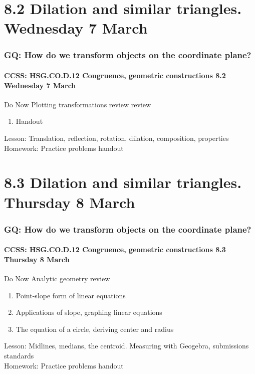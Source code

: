 \documentclass{beamer}
\begin{document}
\section{8.2 Dilation and similar triangles. Wednesday 7 March}
  \frame
  {
    \frametitle{GQ: How do we transform objects on the coordinate plane?}
    \framesubtitle{CCSS: HSG.CO.D.12 Congruence, geometric constructions \hfill \alert{8.2 Wednesday 7 March}}

    \begin{block}{Do Now Plotting transformations review review}
      \begin{enumerate}
        \item Handout
      \end{enumerate}
    \end{block}
    Lesson: Translation, reflection, rotation, dilation, composition, properties\\[0.5cm]
    Homework: Practice problems handout
  }

\section{8.3 Dilation and similar triangles. Thursday 8 March}
  \frame
  {
    \frametitle{GQ: How do we transform objects on the coordinate plane?}
    \framesubtitle{CCSS: HSG.CO.D.12 Congruence, geometric constructions \hfill \alert{8.3 Thursday 8 March}}

    \begin{block}{Do Now Analytic geometry review}
      \begin{enumerate}
        \item Point-slope form of linear equations
        \item Applications of slope, graphing linear equations
        \item The equation of a circle, deriving center and radius
      \end{enumerate}
    \end{block}
    Lesson: Midlines, medians, the centroid. Measuring with Geogebra, submissions standards\\[0.5cm]
    Homework: Practice problems handout
  }
\end{document}
